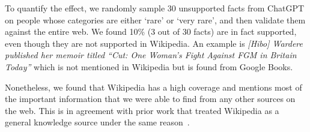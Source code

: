 To quantify the effect, we randomly sample 30 unsupported facts from ChatGPT on people whose categories are either `rare' or `very rare', and then validate them against the entire web. We found 10\% (3 out of 30 facts) are in fact supported, even though they are not supported in Wikipedia. An example is \emph{[Hibo] Wardere published her memoir titled ``Cut: One Woman's Fight Against FGM in Britain Today''} which is not mentioned in Wikipedia but is found from Google Books.

Nonetheless, we found that Wikipedia has a high coverage and mentions most of the important information that we were able to find from any other sources on the web. This is in agreement with prior work that treated Wikipedia as a general knowledge source under the same reason~\cite{chen-etal-2017-reading,petroni-etal-2021-kilt}.
